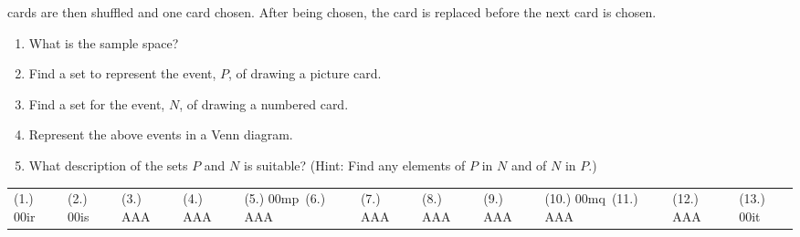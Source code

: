 \begin{eocexercises}{}
\begin{enumerate}[itemsep=5pt, label=\textbf{\arabic*}. ]
    cards are then shuffled and one card chosen. After being chosen,
    the card is replaced before the next card is chosen.
    \begin{enumerate}[noitemsep, label=\textbf{(\alph*)} ]
    \item What is the sample space?
    \item Find a set to represent the event, $P$, of drawing a picture
      card.
    \item Find a set for the event, $N$, of drawing a numbered card.
    \item Represent the above events in a Venn diagram.
    \item What description of the sets $P$ and $N$ is suitable?
      (Hint: Find any elements of $P$ in $N$ and of $N$ in $P$.)
    \end{enumerate}
  \end{enumerate}
\practiceinfo

  \begin{tabularx}{\textwidth}{XXXXX}
    (1.) 00ir& (2.) 00is& (3.) AAA& (4.) AAA& (5.) 00mp\
    (6.) AAA& (7.) AAA& (8.) AAA& (9.) AAA& (10.) 00mq\
    (11.) AAA& (12.) AAA& (13.) 00it\\
  \end{tabularx}
\end{eocexercises}


